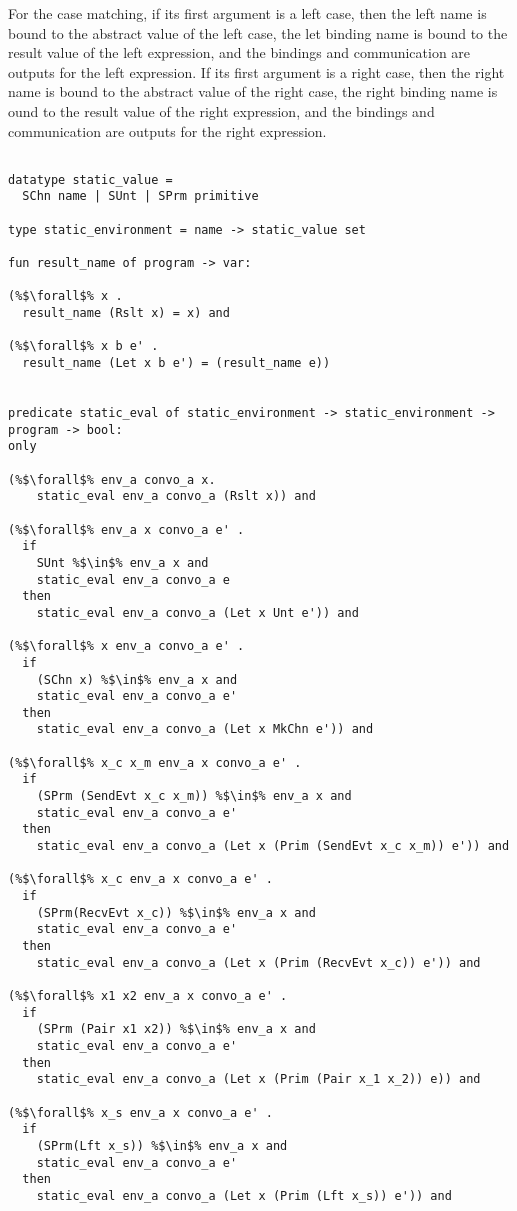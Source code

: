 \documentclass{article}
\begin{document}
For the case matching, if its first argument is a left case, then the left name is bound to the
abstract value of the left case, the let binding name is bound to the result value of the left
expression, and the bindings and communication are outputs for the left expression.  If its
first argument is a right case, then the right name is bound to the abstract value of the right
case, the right binding name is ound to the result value of the right expression, and the
bindings and communication are outputs for the right expression. 

\begin{lstlisting}[language=logic, escapechar=\%]

datatype static_value =
  SChn name | SUnt | SPrm primitive 

type static_environment = name -> static_value set

fun result_name of program -> var:

(%$\forall$% x .
  result_name (Rslt x) = x) and

(%$\forall$% x b e' . 
  result_name (Let x b e') = (result_name e))

  
predicate static_eval of static_environment -> static_environment -> program -> bool:
only

(%$\forall$% env_a convo_a x.
    static_eval env_a convo_a (Rslt x)) and

(%$\forall$% env_a x convo_a e' .
  if 
    SUnt %$\in$% env_a x and
    static_eval env_a convo_a e
  then
    static_eval env_a convo_a (Let x Unt e')) and

(%$\forall$% x env_a convo_a e' .
  if 
    (SChn x) %$\in$% env_a x and
    static_eval env_a convo_a e'
  then  
    static_eval env_a convo_a (Let x MkChn e')) and

(%$\forall$% x_c x_m env_a x convo_a e' .
  if
    (SPrm (SendEvt x_c x_m)) %$\in$% env_a x and
    static_eval env_a convo_a e' 
  then
    static_eval env_a convo_a (Let x (Prim (SendEvt x_c x_m)) e')) and

(%$\forall$% x_c env_a x convo_a e' . 
  if 
    (SPrm(RecvEvt x_c)) %$\in$% env_a x and
    static_eval env_a convo_a e'
  then
    static_eval env_a convo_a (Let x (Prim (RecvEvt x_c)) e')) and

(%$\forall$% x1 x2 env_a x convo_a e' .
  if
    (SPrm (Pair x1 x2)) %$\in$% env_a x and
    static_eval env_a convo_a e'
  then
    static_eval env_a convo_a (Let x (Prim (Pair x_1 x_2)) e)) and

(%$\forall$% x_s env_a x convo_a e' .
  if
    (SPrm(Lft x_s)) %$\in$% env_a x and
    static_eval env_a convo_a e' 
  then
    static_eval env_a convo_a (Let x (Prim (Lft x_s)) e')) and


\end{lstlisting}
\end{document}
